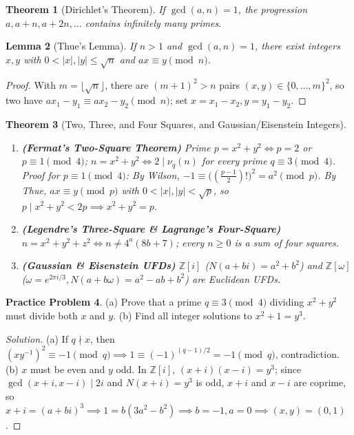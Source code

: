 \documentclass[11pt]{article}
\theoremstyle{plain}
\newtheorem{theorem}{Theorem}[section]
\newtheorem{lemma}[theorem]{Lemma}
\theoremstyle{definition}
\newtheorem{problem}[theorem]{Practice Problem}
\newenvironment{solution}{\begin{proof}[Solution]}{\end{proof}}
\newcommand{\ZZ}{\mathbb{Z}}
\begin{document}
\begin{theorem}[Dirichlet's Theorem]
If $\gcd(a, n) = 1$, the progression $a, a+n, a+2n, \dots$ contains infinitely many primes.
\end{theorem}

\begin{lemma}[Thue's Lemma]
If $n > 1$ and $\gcd(a, n) = 1$, there exist integers $x, y$ with $0 < |x|, |y| \le \sqrt{n}$ and $ax \equiv y \pmod n$.
\end{lemma}
\begin{proof}
With $m = \lfloor\sqrt{n}\rfloor$, there are $(m+1)^2 > n$ pairs $(x,y) \in \{0,\dots,m\}^2$, so two have $ax_1 - y_1 \equiv ax_2 - y_2 \pmod n$; set $x = x_1-x_2, y = y_1-y_2$.
\end{proof}

\begin{theorem}[Two, Three, and Four Squares, and Gaussian/Eisenstein Integers]
\leavevmode
\begin{enumerate}[label=(\alph*)]
\item \textbf{(Fermat's Two-Square Theorem)} Prime $p = x^2+y^2 \iff p=2$ or $p \equiv 1 \pmod 4$; $n = x^2+y^2 \iff 2 \mid \nu_q(n)$ for every prime $q \equiv 3 \pmod 4$. \emph{Proof for $p \equiv 1 \pmod 4$:} By Wilson, $-1 \equiv \bigl((\frac{p-1}{2})!\bigr)^2 = a^2 \pmod p$. By Thue, $ax \equiv y \pmod p$ with $0 < |x|,|y| < \sqrt{p}$, so $p \mid x^2+y^2 < 2p \implies x^2+y^2=p$.
\item \textbf{(Legendre's Three-Square \& Lagrange's Four-Square)} $n = x^2+y^2+z^2 \iff n \ne 4^a(8b+7)$; every $n \ge 0$ is a sum of four squares.
\item \textbf{(Gaussian \& Eisenstein UFDs)} $\ZZ[i]$ ($N(a+bi)=a^2+b^2$) and $\ZZ[\omega]$ ($\omega = e^{2\pi i/3}, N(a+b\omega)=a^2-ab+b^2$) are Euclidean UFDs.
\end{enumerate}
\end{theorem}

\begin{problem}
(a) Prove that a prime $q \equiv 3 \pmod 4$ dividing $x^2+y^2$ must divide both $x$ and $y$.
(b) Find all integer solutions to $x^2 + 1 = y^3$.
\end{problem}
\begin{solution}
(a) If $q \nmid x$, then $(xy^{-1})^2 \equiv -1 \pmod q \implies 1 \equiv (-1)^{(q-1)/2} = -1 \pmod q$, contradiction.
(b) $x$ must be even and $y$ odd. In $\ZZ[i]$, $(x+i)(x-i) = y^3$; since $\gcd(x+i, x-i) \mid 2i$ and $N(x+i) = y^3$ is odd, $x+i$ and $x-i$ are coprime, so $x+i = (a+bi)^3 \implies 1 = b(3a^2-b^2) \implies b=-1, a=0 \implies (x,y)=(0,1)$.
\end{solution}
\end{document}
